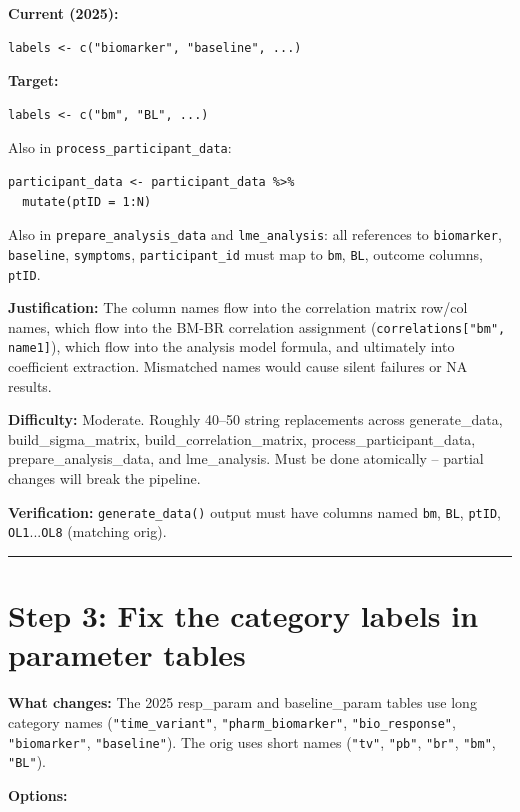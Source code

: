 \documentclass[11pt]{article}
\begin{document}
\textbf{Current (2025):}
\begin{lstlisting}
labels <- c("biomarker", "baseline", ...)
\end{lstlisting}

\textbf{Target:}
\begin{lstlisting}
labels <- c("bm", "BL", ...)
\end{lstlisting}

Also in \texttt{process\_participant\_data}:
\begin{lstlisting}
participant_data <- participant_data %>%
  mutate(ptID = 1:N)
\end{lstlisting}

Also in \texttt{prepare\_analysis\_data} and \texttt{lme\_analysis}: all references
to \texttt{biomarker}, \texttt{baseline}, \texttt{symptoms}, \texttt{participant\_id} must map
to \texttt{bm}, \texttt{BL}, outcome columns, \texttt{ptID}.

\textbf{Justification:} The column names flow into the correlation matrix
row/col names, which flow into the BM-BR correlation assignment
(\texttt{correlations["bm", name1]}), which flow into the analysis model
formula, and ultimately into coefficient extraction. Mismatched
names would cause silent failures or NA results.

\textbf{Difficulty:} Moderate. Roughly 40--50 string replacements across
generate\_data, build\_sigma\_matrix, build\_correlation\_matrix,
process\_participant\_data, prepare\_analysis\_data, and lme\_analysis.
Must be done atomically -- partial changes will break the pipeline.

\textbf{Verification:} \texttt{generate\_data()} output must have columns named
\texttt{bm}, \texttt{BL}, \texttt{ptID}, \texttt{OL1}...\texttt{OL8} (matching orig).

\bigskip\noindent\rule{\textwidth}{0.4pt}\bigskip

\section{Step 3: Fix the category labels in parameter tables}

\textbf{What changes:} The 2025 resp\_param and baseline\_param tables use
long category names (\texttt{"time\_variant"}, \texttt{"pharm\_biomarker"},
\texttt{"bio\_response"}, \texttt{"biomarker"}, \texttt{"baseline"}). The orig uses short
names (\texttt{"tv"}, \texttt{"pb"}, \texttt{"br"}, \texttt{"bm"}, \texttt{"BL"}).

\textbf{Options:}
\end{document}
